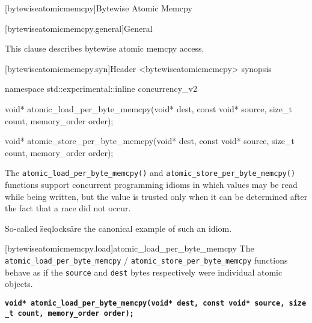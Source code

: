 
[bytewiseatomicmemcpy]{Bytewise Atomic Memcpy}

[bytewiseatomicmemcpy.general]{General}

This clause describes bytewise atomic memcpy access. 


[bytewiseatomicmemcpy.syn]{Header <bytewiseatomicmemcpy> synopsis}

\begin{codeblock}
namespace std::experimental::inline concurrency_v2 {

  void* atomic_load_per_byte_memcpy(void* dest, const void* source, size_t count, memory_order order);

  void* atomic_store_per_byte_memcpy(void* dest, const void* source, size_t count, memory_order order);


}
\end{codeblock}

\pnum

The \texttt{atomic\_load\_per\_byte\_memcpy()} and
\texttt{atomic\_store\_per\_byte\_memcpy()} functions support concurrent
programming idioms in which values may be read while being written, but
the value is trusted only when it can be determined after the fact that
a race did not occur. \begin{note} So-called \"seqlocks\" are the canonical
example of such an idiom. \end{note}


[bytewiseatomicmemcpy.load]{atomic_load_per_byte_memcpy}
\pnum
The \texttt{atomic\_load\_per\_byte\_memcpy} /
\texttt{atomic\_store\_per\_byte\_memcpy} functions behave as if the
\texttt{source} and \texttt{dest} bytes respectively were individual
atomic objects.

\textbf{\texttt{void*\ atomic\_load\_per\_byte\_memcpy(void*\ dest,\ const\ void*\ source,\ size\_t\ count,\ memory\_order\ order);}}

